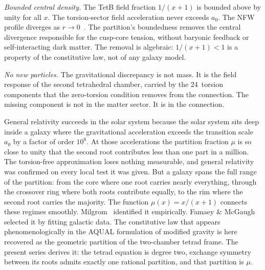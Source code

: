 \documentclass[twocolumn]{iopjournal}
\begin{document}
\textit{Bounded central density.}  The TetB field fraction
$1/(x{+}1)$ is bounded above by unity for all $x$.  The
torsion-sector field acceleration never exceeds $a_0$.  The NFW
profile diverges as $r \to 0$~\cite{NFW1996}.  The partition's
boundedness removes the central divergence responsible for the
cusp-core tension, without baryonic
feedback or self-interacting dark matter.  The removal is
algebraic: $1/(x{+}1) < 1$ is a property of the constitutive
law, not of any galaxy model.

\textit{No new particles.}  The gravitational discrepancy is
not mass.  It is the field response of the second tetrahedral
chamber, carried by the 24~torsion components that the
zero-torsion condition removes from the connection.  The
missing component is not in the matter sector.  It is in the
connection.

General relativity succeeds in the solar system because the
solar system sits deep inside a galaxy where the gravitational
acceleration exceeds the transition scale $a_0$ by a factor of
order $10^8$.  At those accelerations the partition fraction
$\mu$ is so close to unity that the second root contributes
less than one part in a million.  The torsion-free
approximation loses nothing measurable, and general relativity
was confirmed on every local test it was given.  But a galaxy
spans the full range of the partition: from the core where one
root carries nearly everything, through the crossover ring
where both roots contribute equally, to the rim where the
second root carries the majority.  The function
$\mu(x) = x/(x{+}1)$ connects these regimes smoothly.
Milgrom~\cite{Milgrom1983} identified it empirically.  Famaey
\& McGaugh~\cite{FamaeyMcGaugh2012} selected it by fitting
galactic data.  The constitutive law that appears
phenomenologically in the AQUAL formulation of modified
gravity is here recovered as the geometric partition of the
two-chamber tetrad frame.  The present series derives it: the
tetrad equation is degree two, exchange symmetry between its
roots admits exactly one rational partition, and that
partition is $\mu$.
\end{document}
